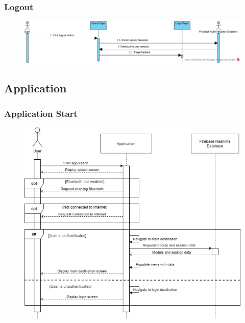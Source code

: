 \documentclass[../report.tex]{subfiles}
\begin{document}
\subsubsection{Logout}
\begin{figure}[H]
\centering
\includegraphics[width=\textwidth]{./images/05-07-web-logout.png}
\label{fig:web-logout-seq}
\end{figure}

\subsection{Application}

\subsubsection{Application Start}
\begin{figure}[H]
\centering
\includegraphics[width=\textwidth]{./images/05-07-app-start.png}
\label{fig:app-start-seq}
\end{figure}
\end{document}
